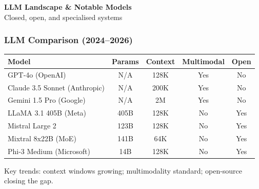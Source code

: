 


\begin{frame}[fragile]\frametitle{}
\begin{center}
{\Large \textbf{LLM Landscape \& Notable Models}}\\[0.5em]
{\normalsize Closed, open, and specialised systems}
\end{center}
\end{frame}

\begin{frame}[fragile]\frametitle{LLM Comparison (2024--2026)}
\begin{center}
\small
\renewcommand{\arraystretch}{1.3}
\begin{tabular}{|l|c|c|c|c|}
\hline
\textbf{Model} & \textbf{Params} & \textbf{Context} & \textbf{Multimodal} & \textbf{Open} \\
\hline
GPT-4o (OpenAI) & N/A & 128K & Yes & No \\
Claude 3.5 Sonnet (Anthropic) & N/A & 200K & Yes & No \\
Gemini 1.5 Pro (Google) & N/A & 2M & Yes & No \\
LLaMA 3.1 405B (Meta) & 405B & 128K & No & Yes \\
Mistral Large 2 & 123B & 128K & No & Yes \\
Mixtral 8x22B (MoE) & 141B & 64K & No & Yes \\
Phi-3 Medium (Microsoft) & 14B & 128K & No & Yes \\
\hline
\end{tabular}
\end{center}
Key trends: context windows growing; multimodality standard; open-source closing the gap.
\end{frame}

